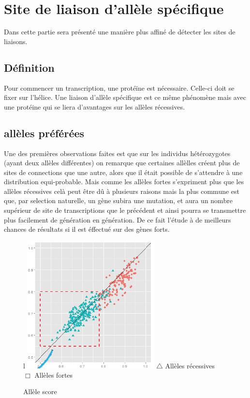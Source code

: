 \section{Site de liaison d'allèle spécifique}
Dans cette partie sera présenté une manière plus affiné de détecter les sites de liaisons. 
\subsection{Définition}
Pour commencer un transcription, une protéïne est nécessaire. Celle-ci doit se fixer sur l'hélice. Une liaison d'allèle spécifique est ce même phénomène mais avec une protéine qui se liera d'avantages sur les allèles récessives.

\subsection{allèles préférées}

Une des premières observations faites est que sur les individus hétérozygotes (ayant deux allèles différentes) on remarque que certaines allèlles créent plus de sites de connections que une autre, alors que il était possible de s'attendre à une distribution equi-probable. 
\newline
\newline
Mais comme les allèles fortes s'expriment plus que les allèles récessives celà peut être dû à plusieurs raisons mais la plus commune est que, par selection naturelle, un gène subira une mutation, et aura un nombre supérieur de site de transcriptions que le précédent et ainsi pourra se transmettre plus facilement de génération en génération. De ce fait l'étude à de meilleurs chances de résultats si il est éffectué sur des gènes forts.
\begin{figure}{l}{}
\centering
\includegraphics{grapheBestAllele}
\newline
\color{blue}
$\triangle$
\color{black} Allèles récessives
\\
\color{red}
$\Box$
\color{black} Allèles fortes
\caption{Allèle score}
\end{figure}


